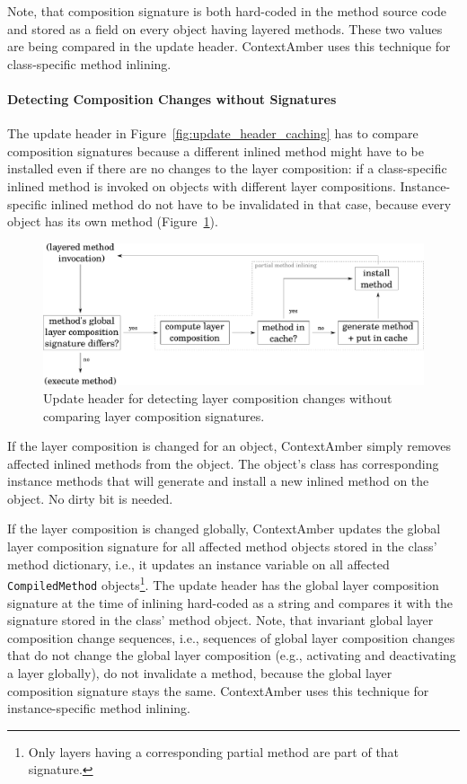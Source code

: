 \documentclass{sig-alternate}
\begin{document}
Note, that composition signature is both hard-coded in the method source code and stored as a field on every object having layered methods. These two values are being compared in the update header. ContextAmber uses this technique for class-specific method inlining.

\paragraph{Detecting Composition Changes without Signatures}
The update header in Figure~\ref{fig:update_header_caching} has to compare composition signatures because a different inlined method might have to be installed even if there are no changes to the layer composition: if a class-specific inlined method is invoked on objects with different layer compositions. Instance-specific inlined method do not have to be invalidated in that case, because every object has its own method (Figure~\ref{fig:update_header_detecting}).

\begin{figure}[!htp]
    \centering
    \includegraphics[width=\columnwidth]{update_header_detecting.pdf}
    \caption{Update header for detecting layer composition changes without comparing layer composition signatures.}
    \label{fig:update_header_detecting}
\end{figure}

If the layer composition is changed for an object, ContextAmber simply removes affected inlined methods from the object. The object's class has corresponding instance methods that will generate and install a new inlined method on the object. No dirty bit is needed. 

If the layer composition is changed globally, ContextAmber updates the global layer composition signature for all affected method objects stored in the class' method dictionary, i.e., it updates an instance variable on all affected \texttt{CompiledMethod} objects\footnote{Only layers
having a corresponding partial method are part of that signature.}. The update header has the global layer composition signature at the time of inlining hard-coded as a string and compares it with the signature stored in the class' method object. Note, that invariant global layer composition change sequences, i.e., sequences of global layer composition changes that do not change the global layer composition (e.g., activating and deactivating a layer globally), do not invalidate a method, because the
global layer composition signature stays the same. ContextAmber uses this technique for instance-specific method inlining.
\end{document}
